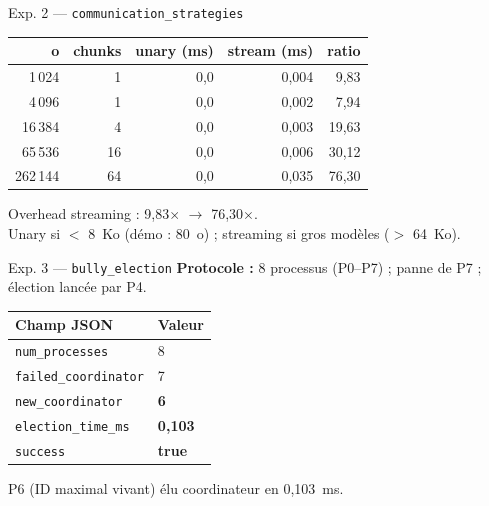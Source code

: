 \documentclass[11pt,french]{beamer}
\begin{document}
\begin{frame}{Exp. 2 --- \texttt{communication\_strategies}}
  \scriptsize
  \begin{tabular}{@{}rrrrr@{}}
    \toprule
    \textbf{o} & \textbf{chunks} & \textbf{unary (ms)} & \textbf{stream (ms)} & \textbf{ratio} \\
    \midrule
    1\,024   & 1  & 0,0 & 0,004 & 9,83 \\
    4\,096   & 1  & 0,0 & 0,002 & 7,94 \\
    16\,384  & 4  & 0,0 & 0,003 & 19,63 \\
    65\,536  & 16 & 0,0 & 0,006 & 30,12 \\
    262\,144 & 64 & 0,0 & 0,035 & 76,30 \\
    \bottomrule
  \end{tabular}

  \vspace{0.3cm}
  \small
  Overhead streaming : 9,83$\times$ $\rightarrow$ 76,30$\times$. \\
  Unary si $<$ 8~Ko (démo : 80~o) ; streaming si gros modèles ($>$ 64~Ko).
\end{frame}

\begin{frame}{Exp. 3 --- \texttt{bully\_election}}
  \textbf{Protocole :} 8 processus (P0--P7) ; panne de P7 ; élection lancée par P4.

  \vspace{0.2cm}
  \scriptsize
  \begin{tabular}{@{}ll@{}}
    \toprule
    \textbf{Champ JSON} & \textbf{Valeur} \\
    \midrule
    \texttt{num\_processes} & 8 \\
    \texttt{failed\_coordinator} & 7 \\
    \texttt{new\_coordinator} & \textbf{6} \\
    \texttt{election\_time\_ms} & \textbf{0,103} \\
    \texttt{success} & \textbf{true} \\
    \bottomrule
  \end{tabular}

  \vspace{0.3cm}
  \small P6 (ID maximal vivant) élu coordinateur en 0,103~ms.
\end{frame}
\end{document}
